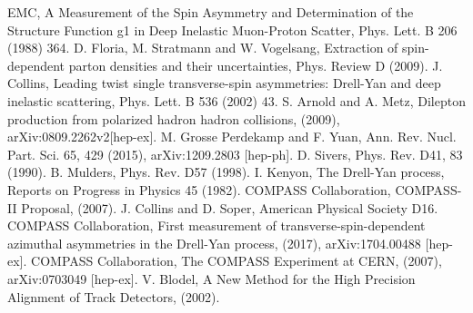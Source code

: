 \begin{thebibliography}{99}

  
 EMC, A Measurement of the Spin Asymmetry and
  Determination of the Structure Function g1 in Deep Inelastic
  Muon-Proton Scatter, Phys. Lett. B 206 (1988) 364.
 D. Floria, M. Stratmann and
  W. Vogelsang, Extraction of spin-dependent parton densities and
  their uncertainties, Phys. Review D (2009).
 J. Collins, Leading twist single
  transverse-spin asymmetries: Drell-Yan and deep inelastic
  scattering, Phys. Lett. B 536 (2002) 43.
 S. Arnold and A. Metz, Dilepton production from
  polarized hadron hadron collisions, (2009),
  arXiv:0809.2262v2[hep-ex].
 M. Grosse Perdekamp and F. Yuan,
  Ann. Rev. Nucl. Part. Sci. 65, 429 (2015), arXiv:1209.2803 [hep-ph].
 D. Sivers, Phys. Rev. D41, 83 (1990).
 B. Mulders, Phys. Rev. D57 (1998).
 I. Kenyon, The Drell-Yan process, Reports on
  Progress in Physics 45 (1982).
 COMPASS Collaboration, COMPASS-II Proposal, (2007).
 J. Collins and D. Soper, American Physical
  Society D16.
 COMPASS Collaboration, First measurement of
  transverse-spin-dependent azimuthal asymmetries in the Drell-Yan
  process, (2017), arXiv:1704.00488 [hep-ex].
 COMPASS Collaboration, The COMPASS Experiment at
  CERN, (2007), arXiv:0703049 [hep-ex].
 V. Blodel, A New Method for the High Precision
  Alignment of Track Detectors, (2002).

  
\end{thebibliography}
